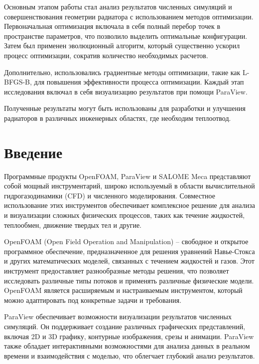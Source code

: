 \documentclass[a4paper,12pt]{article}
\theoremstyle{plain} %
\theoremstyle{definition} %
\theoremstyle{remark} %
\begin{document}
Основным этапом работы стал анализ результатов численных симуляций и совершенствования геометрии радиатора с использованием методов оптимизации. Первоначальная оптимизация включала в себя полный перебор точек в пространстве параметров, что позволило выделить оптимальные конфигурации. Затем был применен эволюционный алгоритм, который существенно ускорил процесс оптимизации, сократив количество необходимых расчетов.

Дополнительно, использовались градиентные методы оптимизации, такие как L-BFGS-B, для повышения эффективности процесса оптимизации. Каждый этап исследования включал в себя визуализацию результатов при помощи ParaView.

Полученные результаты могут быть использованы для разработки и улучшения радиаторов в различных инженерных областях, где необходим теплоотвод.

\newpage 
\tableofcontents
\setcounter{page}{3}

\newpage
\section{Введение}

Программные продукты OpenFOAM, ParaView и SALOME Meca представляют собой мощный инструментарий, широко используемый в области вычислительной гидрогазодинамики (CFD) и численного моделирования. Совместное использование этих инструментов обеспечивает комплексное решение для анализа и визуализации сложных физических процессов, таких как течение жидкостей, теплообмен, движение твердых тел и другие.

OpenFOAM (Open Field Operation and Manipulation) -- свободное и открытое программное обеспечение, предназначенное для решения уравнений Навье-Стокса и других математических моделей, связанных с течением жидкостей и газов. Этот инструмент предоставляет разнообразные методы решения, что позволяет исследовать различные типы потоков и применять различные физические модели. OpenFOAM является расширяемым и настраиваемым инструментом, который можно адаптировать под конкретные задачи и требования.

ParaView обеспечивает возможности визуализации результатов численных симуляций. Он поддерживает создание различных графических представлений, включая 2D и 3D графику, контурные изображения, срезы и анимации. ParaView также обладает интерактивными возможностями для анализа данных в реальном времени и взаимодействия с моделью, что облегчает глубокий анализ результатов.
\end{document}
